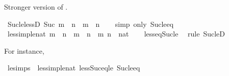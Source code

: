 \begin{isabellebody}
\endisatagproof
{\isafoldproof}%
%
\isadelimproof
%
\endisadelimproof
%
\begin{isamarkuptext}%
Stronger version of .%
\end{isamarkuptext}\isamarkuptrue%
\isamarkupfalse%
\ Suc{\isacharunderscore}{\kern0pt}le{\isacharunderscore}{\kern0pt}lessD{\isacharcolon}{\kern0pt}\ {\isachardoublequoteopen}Suc\ m\ {\isasymle}\ n\ {\isasymLongrightarrow}\ m\ {\isacharless}{\kern0pt}\ n{\isachardoublequoteclose}\isanewline
%
\isadelimproof
\ \ %
\endisadelimproof
%
\isatagproof
{}\isamarkupfalse%
\ {\isacharparenleft}{\kern0pt}simp\ only{\isacharcolon}{\kern0pt}\ Suc{\isacharunderscore}{\kern0pt}le{\isacharunderscore}{\kern0pt}eq{\isacharparenright}{\kern0pt}%
\endisatagproof
{\isafoldproof}%
%
\isadelimproof
\isanewline
%
\endisadelimproof
\isanewline
{}\isamarkupfalse%
\ less{\isacharunderscore}{\kern0pt}imp{\isacharunderscore}{\kern0pt}le{\isacharunderscore}{\kern0pt}nat{\isacharcolon}{\kern0pt}\ {\isachardoublequoteopen}m\ {\isacharless}{\kern0pt}\ n\ {\isasymLongrightarrow}\ m\ {\isasymle}\ n{\isachardoublequoteclose}\ \ m\ n\ {\isacharcolon}{\kern0pt}{\isacharcolon}{\kern0pt}\ nat\isanewline
%
\isadelimproof
\ \ %
\endisadelimproof
%
\isatagproof
{}\isamarkupfalse%
\ less{\isacharunderscore}{\kern0pt}eq{\isacharunderscore}{\kern0pt}Suc{\isacharunderscore}{\kern0pt}le\ \isamarkupfalse%
\ {\isacharparenleft}{\kern0pt}rule\ Suc{\isacharunderscore}{\kern0pt}leD{\isacharparenright}{\kern0pt}%
\endisatagproof
{\isafoldproof}%
%
\isadelimproof
%
\endisadelimproof
%
\begin{isamarkuptext}%
For instance, %
\end{isamarkuptext}\isamarkuptrue%
\isamarkupfalse%
\ le{\isacharunderscore}{\kern0pt}simps\ {\isacharequal}{\kern0pt}\ less{\isacharunderscore}{\kern0pt}imp{\isacharunderscore}{\kern0pt}le{\isacharunderscore}{\kern0pt}nat\ less{\isacharunderscore}{\kern0pt}Suc{\isacharunderscore}{\kern0pt}eq{\isacharunderscore}{\kern0pt}le\ Suc{\isacharunderscore}{\kern0pt}le{\isacharunderscore}{\kern0pt}eq%
\begin{isamarkuptext}%

\end{isamarkuptext}
\end{isabellebody}
